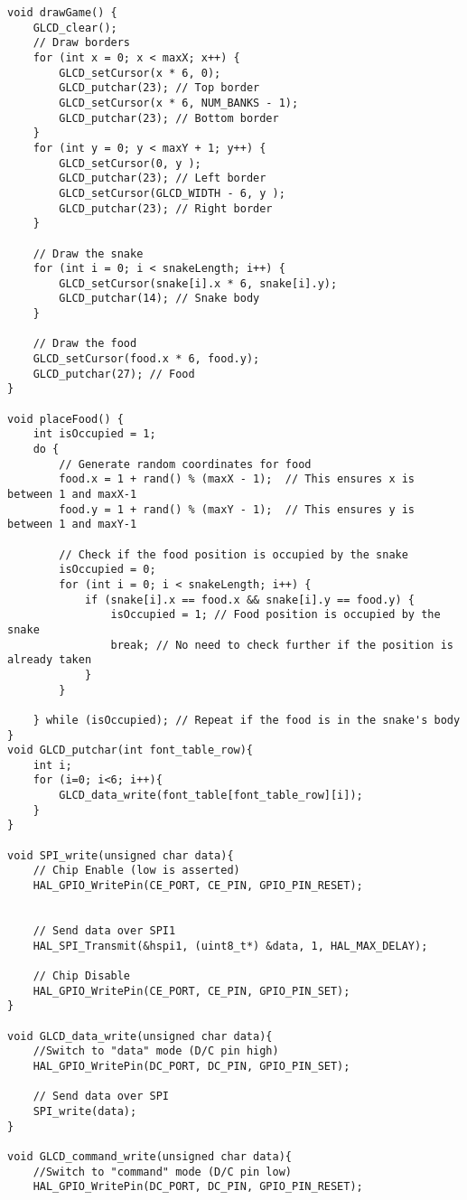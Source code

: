 \begin{lstlisting}[style=CStyle]
void drawGame() {
    GLCD_clear();
    // Draw borders
    for (int x = 0; x < maxX; x++) {
        GLCD_setCursor(x * 6, 0);
        GLCD_putchar(23); // Top border
        GLCD_setCursor(x * 6, NUM_BANKS - 1);
        GLCD_putchar(23); // Bottom border
    }
    for (int y = 0; y < maxY + 1; y++) {
        GLCD_setCursor(0, y );
        GLCD_putchar(23); // Left border
        GLCD_setCursor(GLCD_WIDTH - 6, y );
        GLCD_putchar(23); // Right border
    }

    // Draw the snake
    for (int i = 0; i < snakeLength; i++) {
        GLCD_setCursor(snake[i].x * 6, snake[i].y);
        GLCD_putchar(14); // Snake body
    }

    // Draw the food
    GLCD_setCursor(food.x * 6, food.y);
    GLCD_putchar(27); // Food
}

void placeFood() {
	int isOccupied = 1;
	do {
        // Generate random coordinates for food
        food.x = 1 + rand() % (maxX - 1);  // This ensures x is between 1 and maxX-1
        food.y = 1 + rand() % (maxY - 1);  // This ensures y is between 1 and maxY-1

        // Check if the food position is occupied by the snake
        isOccupied = 0;
        for (int i = 0; i < snakeLength; i++) {
            if (snake[i].x == food.x && snake[i].y == food.y) {
                isOccupied = 1; // Food position is occupied by the snake
                break; // No need to check further if the position is already taken
            }
        }

    } while (isOccupied); // Repeat if the food is in the snake's body
}
void GLCD_putchar(int font_table_row){
	int i;
	for (i=0; i<6; i++){
		GLCD_data_write(font_table[font_table_row][i]);
	}
}

void SPI_write(unsigned char data){
	// Chip Enable (low is asserted)
	HAL_GPIO_WritePin(CE_PORT, CE_PIN, GPIO_PIN_RESET);


	// Send data over SPI1
	HAL_SPI_Transmit(&hspi1, (uint8_t*) &data, 1, HAL_MAX_DELAY);

	// Chip Disable
	HAL_GPIO_WritePin(CE_PORT, CE_PIN, GPIO_PIN_SET);
}

void GLCD_data_write(unsigned char data){
	//Switch to "data" mode (D/C pin high)
	HAL_GPIO_WritePin(DC_PORT, DC_PIN, GPIO_PIN_SET);

	// Send data over SPI
	SPI_write(data);
}

void GLCD_command_write(unsigned char data){
	//Switch to "command" mode (D/C pin low)
	HAL_GPIO_WritePin(DC_PORT, DC_PIN, GPIO_PIN_RESET);


\end{lstlisting}
